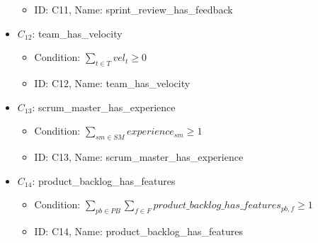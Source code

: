 \documentclass{article}
\begin{document}
\begin{itemize}
\begin{itemize}
            \item ID: C11, Name: sprint\_review\_has\_feedback
        \end{itemize}
    \item $C_{12}$: team\_has\_velocity
        \begin{itemize}
            \item Condition: $\sum_{t \in T} vel_t \geq 0$
            \item ID: C12, Name: team\_has\_velocity
        \end{itemize}
    \item $C_{13}$: scrum\_master\_has\_experience
        \begin{itemize}
            \item Condition: $\sum_{sm \in SM} experience_{sm} \geq 1$
            \item ID: C13, Name: scrum\_master\_has\_experience
        \end{itemize}
    \item $C_{14}$: product\_backlog\_has\_features
        \begin{itemize}
            \item Condition: $\sum_{pb \in PB} \sum_{f \in F} product\_backlog\_has\_features_{pb,f} \geq 1$
            \item ID: C14, Name: product\_backlog\_has\_features
        \end{itemize}
\end{itemize}
\end{document}
